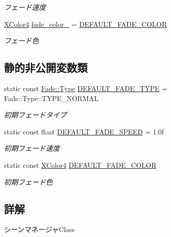 \begin{DoxyCompactItemize}
\begin{DoxyCompactList}\small\item\em フェード速度 \end{DoxyCompactList}\item 
\mbox{\hyperlink{_vector3_d_8h_a680c30c4a07d86fe763c7e01169cd6cc}{X\+Color4}} \mbox{\hyperlink{class_scene_manager_a978b815258c4591f81a16995484fe9fb}{fade\+\_\+color\+\_\+}} = \mbox{\hyperlink{class_scene_manager_a8b6874644ba8998b0db76780d56f371f}{D\+E\+F\+A\+U\+L\+T\+\_\+\+F\+A\+D\+E\+\_\+\+C\+O\+L\+OR}}
\begin{DoxyCompactList}\small\item\em フェード色 \end{DoxyCompactList}\end{DoxyCompactItemize}
\subsection*{静的非公開変数類}
\begin{DoxyCompactItemize}
\item 
static const \mbox{\hyperlink{class_fade_ac06f27215b454aa05b93c236476d6e80}{Fade\+::\+Type}} \mbox{\hyperlink{class_scene_manager_ab87f30ef7e11305bb4e3400b41225c22}{D\+E\+F\+A\+U\+L\+T\+\_\+\+F\+A\+D\+E\+\_\+\+T\+Y\+PE}} = Fade\+::\+Type\+::\+T\+Y\+P\+E\+\_\+\+N\+O\+R\+M\+AL
\begin{DoxyCompactList}\small\item\em 初期フェードタイプ \end{DoxyCompactList}\item 
static const float \mbox{\hyperlink{class_scene_manager_a58cd446096f95d3e62e7eba16a4096ee}{D\+E\+F\+A\+U\+L\+T\+\_\+\+F\+A\+D\+E\+\_\+\+S\+P\+E\+ED}} = 1.\+0f
\begin{DoxyCompactList}\small\item\em 初期フェード速度 \end{DoxyCompactList}\item 
static const \mbox{\hyperlink{_vector3_d_8h_a680c30c4a07d86fe763c7e01169cd6cc}{X\+Color4}} \mbox{\hyperlink{class_scene_manager_a8b6874644ba8998b0db76780d56f371f}{D\+E\+F\+A\+U\+L\+T\+\_\+\+F\+A\+D\+E\+\_\+\+C\+O\+L\+OR}}
\begin{DoxyCompactList}\small\item\em 初期フェード色 \end{DoxyCompactList}\end{DoxyCompactItemize}


\subsection{詳解}
シーンマネージャ\+Class 

